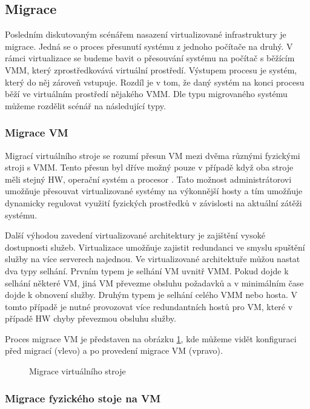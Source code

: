 \subsection{Migrace}

Posledním diskutovaným scénářem nasazení virtualizované infrastruktury je migrace. Jedná se o proces přesunutí systému z jednoho počítače na druhý. V rámci virtualizace se budeme bavit o přesouvání systému na počítač s běžícím VMM,
který zprostředkovává virtuální prostředí. Výstupem procesu je systém, který do něj zároveň vstupuje. Rozdíl je v tom, že daný systém na konci procesu běží ve virtuálním prostředí nějakého VMM. Dle typu migrovaného systému můžeme
rozdělit scénář na následující typy.

\subsubsection*{Migrace VM}

Migrací virtuálního stroje se rozumí přesun VM mezi dvěma různými fyzickými stroji s VMM. Tento přesun byl dříve možný pouze v případě když oba stroje měli stejný HW, operační systém a procesor \cite{reasons}.
Tato možnost administrátorovi umožňuje přesouvat virtualizované systémy na výkonnější hosty a tím umožňuje dynamicky regulovat využití fyzických prostředků v závislosti na aktuální zátěži systému.

Další výhodou zavedení virtualizované architektury je zajištění vysoké dostupnosti služeb. Virtualizace umožňuje zajistit redundanci ve smyslu spuštění služby na více serverech najednou. Ve virtualizované architektuře můžou
nastat dva typy selhání. Prvním typem je selhání VM uvnitř VMM. Pokud dojde k selhání některé VM, jiná VM převezme obsluhu požadavků a v minimálním čase dojde k obnovení služby. Druhým typem je selhání celého VMM nebo hosta.
V tomto případě je nutné provozovat více redundantních hostů pro VM, které v případě HW chyby převezmou obsluhu služby.

Proces migrace VM je představen na obrázku \ref{migration1}, kde můžeme vidět konfiguraci před migrací (vlevo) a po provedení migrace VM (vpravo).

\begin{figure}
    \centering    
    \caption{Migrace virtuálního stroje}
    \label{migration1}
\end{figure}

\subsubsection*{Migrace fyzického stoje na VM}

